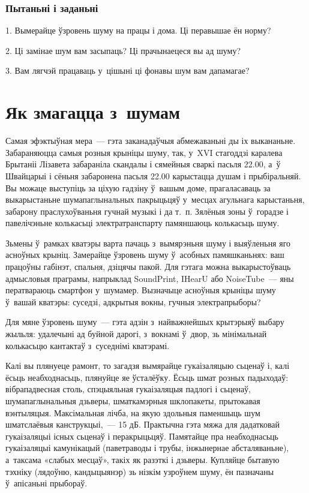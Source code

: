 \subsubsection{Пытаньні і заданьні}

1. Вымерайце ўзровень шуму на працы і дома. Ці перавышае ён норму?

2. Ці замінае шум вам засыпаць? Ці прачынаецеся вы ад шуму?

3. Вам лягчэй працаваць у~цішыні ці фонавы шум вам дапамагае?


\section{Як змагацца з~шумам}

Самая эфэктыўная мера~--- гэта заканадаўчыя абмежаваньні ды іх выкананьне. Забараняюцца самыя розныя крыніцы шуму, так, у~XVI стагоддзі каралева Брытаніі Лізавета забараніла скандалы і сямейныя сваркі пасьля 22.00, а~ў Швайцарыі і сёньня забаронена пасьля 22.00 карыстацца душам і прыбіральняй. Вы можаце выступіць за ціхую гадзіну ў~вашым доме, прагаласаваць за выкарыстаньне шумапаглынальных пакрыцьцяў у~месцах агульнага карыстаньня, забарону праслухоўваньня гучнай музыкі і да т.~п. Зялёныя зоны ў~горадзе і павелічэньне колькасьці электратранспарту памяншаюць колькасьць шуму.

Зьмены ў~рамках кватэры варта пачаць з~вымярэньня шуму і выяўленьня яго асноўных крыніц. Замерайце ўзровень шуму ў~асобных памяшканьнях: ваш працоўны габінэт, спальня, дзіцячы пакой. Для гэтага можна выкарыстоўваць адмысловыя праграмы, напрыклад SoundPrint, IHearU або NoiseTube~--- яны ператвараюць смартфон у~шумамер. Вызначыце асноўныя крыніцы шуму ў~вашай кватэры: суседзі, адкрытыя вокны, гучныя электрапрыборы?

Для мяне ўзровень шуму~--- гэта адзін з~найважнейшых крытэрыяў выбару жыльля: удалечыні ад буйной дарогі, з~вокнамі ў~двор, зь мінімальнай колькасьцю кантактаў з~суседнімі кватэрамі.

Калі вы плянуеце рамонт, то загадзя вымярайце гукаізаляцыю сьценаў і, калі ёсьць неабходнасьць, плянуйце яе ўсталёўку. Ёсьць шмат розных падыходаў: вібрападвесная столь, спэцыяльная гукаізаляцыя падлогі і сьценаў, шумапаглынальныя дзьверы, шматкамэрныя шклопакеты, прытокавая вэнтыляцыя. Максімальная лічба, на якую здольныя паменшыць шум шматслаёвыя канструкцыі,~--- 15 дБ. Практычна гэта мяжа для дадатковай гукаізаляцыі існых сьценаў і перакрыцьцяў. Памятайце пра неабходнасьць гукаізаляцыі камунікацый (паветраводы і трубы, інжынернае абсталяваньне), а~таксама «слабых месцаў», такіх як разэткі і дзьверы. Купляйце бытавую тэхніку (лядоўню, кандыцыянэр) зь нізкім узроўнем шуму, ён пазначаны ў~апісаньні прыбораў.

